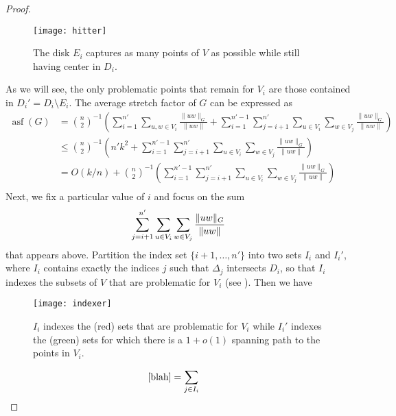 \documentclass{patmorin}
\DeclareMathOperator{\asf}{asf}
\begin{document}
\begin{proof}
  \begin{figure}
    \begin{center}
      \texttt{[image: hitter]}
    \end{center}
    \caption{The disk $E_i$ captures as many points of $V$ as possible
     while still having center in $D_i$.}
  \end{figure}

  As we will see, the only problematic points that remain for $V_i$
  are those contained in $D_i'=D_i\setminus E_i$.  The average stretch
  factor of $G$ can be expressed as
  \begin{align*}
    \asf(G) 
      & = 
      \binom n2^{-1}\left(
        \sum_{i=1}^{n'}\sum_{u,w\in V_i}\frac{\|uw\|_G}{\|uw\|}  
         + \sum_{i=1}^{n'-1}\sum_{j={i+1}}^{n'}
            \sum_{u\in V_i}\sum_{w\in V_j}\frac{\|uw\|_G}{\|uw\|}
      \right)  \\
      & \le 
         \binom n2^{-1}\left(n'k^2 
          + \sum_{i=1}^{n'-1}\sum_{j={i+1}}^{n'}
           \sum_{u\in V_i}\sum_{w\in V_j}\frac{\|uw\|_G}{\|uw\|}
      \right)  \\
      & = 
         O(k/n) + \binom n2^{-1}\left(  
          \sum_{i=1}^{n'-1}\sum_{j={i+1}}^{n'}
           \sum_{u\in V_i}\sum_{w\in V_j}\frac{\|uw\|_G}{\|uw\|}
      \right)  \\
   \end{align*}
  Next, we fix a particular value of $i$ and focus on the sum
  \begin{equation}
       \sum_{j={i+1}}^{n'}
          \sum_{u\in V_i}\sum_{w\in V_j}\frac{\|uw\|_G}{\|uw\|}
          \eqlabel{blah}
  \end{equation}
  that appears above.  Partition the index set $\{i+1,\ldots,n'\}$ into
  two sets $I_i$ and $I_i'$, where $I_i$ contains exactly the indices
  $j$ such that $\Delta_j$ intersects $D_i$, so that $I_i$ indexes the
  subsets of $V$ that are problematic for $V_i$ (see ).
  Then we have
  \begin{figure}
    \begin{center}
      \texttt{[image: indexer]}
    \end{center}
    \caption{$I_i$ indexes the (red) sets that are problematic for $V_i$
     while $I_i'$ indexes the (green) sets for which there is a $1+o(1)$
     spanning path to the points in $V_i$.}
  \end{figure}
  \begin{align*}
     \eqref{blah} 
      & = \sum_{j\in I_i}

\end{align*}
\end{proof}
\end{document}
